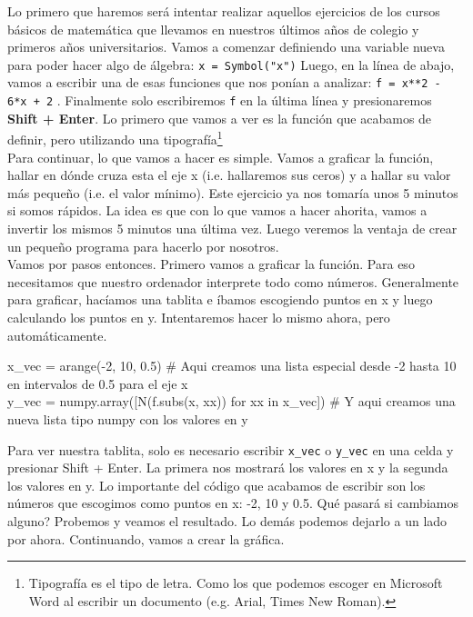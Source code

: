 \documentclass[10pt,letterpaper]{article}
\newcommand{\inlinecode}[1]{
\colorbox{light-gray}{\texttt{#1}}
}
\newenvironment{Code}
{
\begin{lrbox}{\selvestebox}%
\begin{minipage}{\dimexpr\columnwidth-2\fboxsep\relax}
\fontfamily{\ttdefault}\selectfont
}
{\end{minipage}\end{lrbox}%
\begin{center}
\colorbox{light-gray}{\usebox{\selvestebox}}
\end{center}
}
\begin{document}
Lo primero que haremos ser\'a intentar realizar aquellos ejercicios de los cursos b\'asicos de matem\'atica que llevamos en nuestros \'ultimos a\~nos de colegio y primeros a\~nos universitarios. Vamos a comenzar definiendo una variable nueva para poder hacer algo de \'algebra: \inlinecode{x = Symbol("x")} Luego, en la l\'inea de abajo, vamos a escribir una de esas funciones que nos pon\'ian a analizar: \inlinecode{f = x**2 - 6*x + 2}. Finalmente solo escribiremos \inlinecode{f} en la \'ultima l\'inea y presionaremos \textbf{Shift + Enter}. Lo primero que vamos a ver es la funci\'on que acabamos de definir, pero utilizando una tipograf\'ia\footnote{Tipograf\'ia es el tipo de letra. Como los que podemos escoger en Microsoft Word al escribir un documento (e.g. Arial, Times New Roman).}\\

Para continuar, lo que vamos a hacer es simple. Vamos a graficar la funci\'on, hallar en d\'onde cruza esta el eje x (i.e. hallaremos sus ceros) y a hallar su valor m\'as peque\~no (i.e. el valor m\'inimo). Este ejercicio ya nos tomar\'ia unos 5 minutos si somos r\'apidos. La idea es que con lo que vamos a hacer ahorita, vamos a invertir los mismos 5 minutos una \'ultima vez. Luego veremos la ventaja de crear un peque\~no programa para hacerlo por nosotros.\\

\noindent Vamos por pasos entonces. Primero vamos a graficar la funci\'on. Para eso necesitamos que nuestro ordenador interprete todo como n\'umeros. Generalmente para graficar, hac\'iamos una tablita e \'ibamos escogiendo puntos en x y luego calculando los puntos en y. Intentaremos hacer lo mismo ahora, pero autom\'aticamente.

\begin{footnotesize}
\begin{Code}
x\_vec = arange(-2, 10, 0.5) \# Aqui creamos una lista especial desde -2 hasta 10 en intervalos de 0.5 para el eje x\\
y\_vec = numpy.array([N(f.subs(x, xx)) for xx in x\_vec]) \# Y aqui creamos una nueva lista tipo numpy con los valores en y
\end{Code}
\end{footnotesize}

\noindent Para ver nuestra tablita, solo es necesario escribir \inlinecode{x\_vec} o \inlinecode{y\_vec} en una celda y presionar Shift + Enter. La primera nos mostrar\'a los valores en x y la segunda los valores en y. Lo importante del c\'odigo que acabamos de escribir son los n\'umeros que escogimos como puntos en x: -2, 10 y 0.5. Qu\'e pasar\'a si cambiamos alguno? Probemos y veamos el resultado. Lo dem\'as podemos dejarlo a un lado por ahora. Continuando, vamos a crear la gr\'afica.
\end{document}
